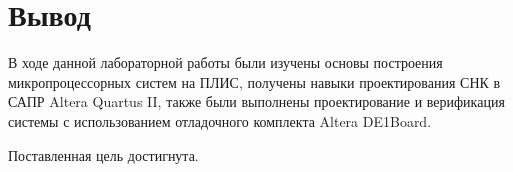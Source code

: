 \chapter*{\textbf{Вывод}}
В ходе данной лабораторной работы были изучены основы построения микропроцессорных систем на ПЛИС, получены навыки проектирования СНК в САПР Altera Quartus II, также были выполнены проектирование и верификация системы с использованием отладочного комплекта  Altera DE1Board.

Поставленная цель достигнута.